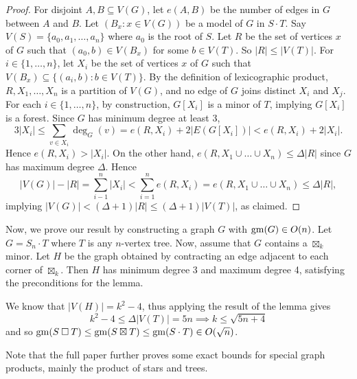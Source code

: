 \documentclass[../main.tex]{subfiles}
\begin{document}
	\begin{proof}
		For disjoint $A,B\subseteq V(G)$, let $e(A,B)$ be the number of edges in $G$ between $A$ and $B$. Let
		$(B_x:x\in V(G))$ be a model of $G$ in $S \cdot T$. Say $V(S)=\{a_0,a_1,\dots,a_n\}$ where $a_0$ is the root of $S$. Let $R$ be the set of vertices $x$ of $G$ such that $(a_0,b)\in V(B_x)$ for some $b\in V(T)$. So $|R|\leq |V(T)|$. For $i\in\{1,\dots,n\}$, let $X_i$ be the set of vertices $x$ of $G$ such that $V(B_x)\subseteq \{(a_i,b): b\in V(T)\}$. By the definition of lexicographic product,  $R,X_1,\dots,X_n$ is a partition of $V(G)$, and no edge of $G$ joins distinct $X_i$ and $X_j$. For each $i\in\{1,\dots,n\}$, by construction, $G[X_i]$ is a minor of $T$, implying $G[X_i]$ is a forest. Since $G$ has minimum degree at least 3, 
		$$3|X_i| \leq \sum_{v\in X_i}\deg_G(v) = e(R,X_i)+2|E(G[X_i])| < e(R,X_i) + 2|X_i|.$$
		Hence $e(R,X_i)> |X_i|$. On the other hand,  $e(R,X_1\cup\dots\cup X_n) \leq \Delta|R|$ since $G$ has maximum degree $\Delta$. Hence 
		$$|V(G)|-|R| = \sum_{i-1}^n|X_i| < \sum_{i=1}^n e(R,X_i) = e(R,X_1\cup\dots\cup X_n) \leq \Delta|R| ,$$
		implying $|V(G)|< (\Delta+1)|R| \leq (\Delta+1) |V(T)|$, as claimed. 
	\end{proof}
	
	Now, we prove our result by constructing a graph $G$ with $\operatorname{gm}(G) \in O(n)$. Let $G = S_n\cdot T$ where $T$ is any $n$-vertex tree. Now, assume that $G$ contains a $\boxtimes_k$ minor. Let $H$ be the graph obtained by contracting an edge adjacent to each corner of $\boxtimes_k$. Then $H$ has minimum degree 3 and maximum degree 4, satisfying the preconditions for the lemma. 
	
	We know that $|V(H)| = k^2 - 4$, thus applying the result of the lemma gives 
	$$k^2 - 4 \le \Delta|V(T)| = 5n \implies k \le \sqrt{5n + 4}$$ 
	and so $\operatorname{gm}(S\mathbin{\Box} T) \le \operatorname{gm}(S\boxtimes T)\le \operatorname{gm}(S\cdot T) \in O(\sqrt{n})$.

	
	Note that the full paper \cite{DMWW24} further proves some exact bounds for special graph products, mainly the product of stars and trees. 
	
	
	
	
	
\end{document}
